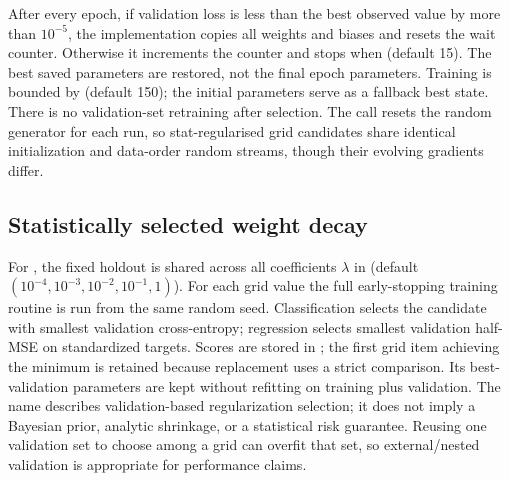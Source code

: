 \documentclass[conference]{IEEEtran}
\begin{document}
After every epoch, if validation loss is less than the best observed value by more than $10^{-5}$, the implementation copies all weights and biases and resets the wait counter. Otherwise it increments the counter and stops when  (default 15). The best saved parameters are restored, not the final epoch parameters. Training is bounded by  (default 150); the initial parameters serve as a fallback best state. There is no validation-set retraining after selection. The call  resets the random generator for each run, so stat-regularised grid candidates share identical initialization and data-order random streams, though their evolving gradients differ.

\subsection{Statistically selected weight decay}
For , the fixed holdout is shared across all coefficients $\lambda$ in  (default $(10^{-4},10^{-3},10^{-2},10^{-1},1)$). For each grid value the full early-stopping training routine is run from the same random seed. Classification selects the candidate with smallest validation cross-entropy; regression selects smallest validation half-MSE on standardized targets. Scores are stored in ; the first grid item achieving the minimum is retained because replacement uses a strict comparison. Its best-validation parameters are kept without refitting on training plus validation. The name describes validation-based regularization selection; it does not imply a Bayesian prior, analytic shrinkage, or a statistical risk guarantee. Reusing one validation set to choose among a grid can overfit that set, so external/nested validation is appropriate for performance claims.
\end{document}
